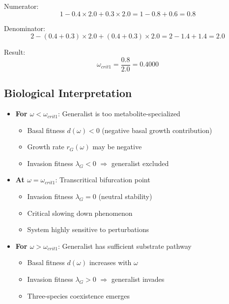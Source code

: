 \documentclass[11pt]{article}
\begin{document}
Numerator:
\begin{equation}
1 - 0.4 \times 2.0 + 0.3 \times 2.0 = 1 - 0.8 + 0.6 = 0.8
\end{equation}

Denominator:
\begin{equation}
2 - (0.4 + 0.3) \times 2.0 + (0.4 + 0.3) \times 2.0 = 2 - 1.4 + 1.4 = 2.0
\end{equation}

Result:
\begin{equation}
\boxed{\omega_{crit1} = \frac{0.8}{2.0} = 0.4000}
\end{equation}

\subsection{Biological Interpretation}

\begin{itemize}
    \item \textbf{For $\omega < \omega_{crit1}$}: Generalist is too metabolite-specialized
    \begin{itemize}
        \item Basal fitness $d(\omega) < 0$ (negative basal growth contribution)
        \item Growth rate $r_G(\omega)$ may be negative
        \item Invasion fitness $\lambda_G < 0$ $\Rightarrow$ generalist excluded
    \end{itemize}

    \item \textbf{At $\omega = \omega_{crit1}$}: Transcritical bifurcation point
    \begin{itemize}
        \item Invasion fitness $\lambda_G = 0$ (neutral stability)
        \item Critical slowing down phenomenon
        \item System highly sensitive to perturbations
    \end{itemize}

    \item \textbf{For $\omega > \omega_{crit1}$}: Generalist has sufficient substrate pathway
    \begin{itemize}
        \item Basal fitness $d(\omega)$ increases with $\omega$
        \item Invasion fitness $\lambda_G > 0$ $\Rightarrow$ generalist invades
        \item Three-species coexistence emerges
    \end{itemize}
\end{itemize}
\end{document}
